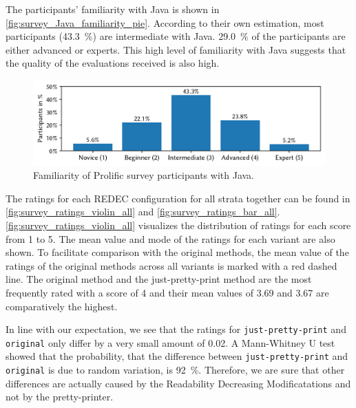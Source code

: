 \documentclass[%
class=scrreprt,
chapterprefix=false,%
open=right,%
twoside=false,%
paper=a4,%
logofile={Logo\_zentral\_farbig\_EN.png},%
thesistype=master,%
UKenglish,%
]{se2thesis}
\theoremstyle{definition}
\newcommand{\rdh}{REDEC\xspace}
\newcommand{\RDMs}{Readability Decreasing Modificatations\xspace}
\newcommand{\none}{just-pretty-print\xspace} %
\newcommand{\nonet}{\texttt{\none}\xspace} %
\begin{document}
	The participants' familiarity with Java is shown in \autoref{fig:survey_Java_familiarity_pie}. According to their own estimation, most participants (43.3~\%) are intermediate with Java. 29.0~\% of the participants are either advanced or experts. This high level of familiarity with Java suggests that the quality of the evaluations received is also high.
	
	\begin{figure}[tb]
		\centering
		\includegraphics[width=\textwidth]{img/survey_java_familiarity_bar.pdf}
		\caption{Familiarity of Prolific survey participants with Java.}
		\label{fig:survey_Java_familiarity_pie}
	\end{figure}
		
	The ratings for each \rdh configuration for all strata together can be found in \autoref{fig:survey_ratings_violin_all} and \autoref{fig:survey_ratings_bar_all}.
	\autoref{fig:survey_ratings_violin_all}  visualizes the distribution of ratings for each score from 1 to 5. The mean value and mode of the ratings for each variant are also shown. To facilitate comparison with the original methods, the mean value of the ratings of the original methods across all variants is marked with a red dashed line. The original method and the just-pretty-print method are the most frequently rated with a score of 4 and their mean values of 3.69 and 3.67 are comparatively the highest.
	
	In line with our expectation, we see that the ratings for \nonet and \texttt{original} only differ by a very small amount of 0.02. A Mann-Whitney U test showed that the probability, that the difference between \nonet and \texttt{original} is due to random variation, is 92~\%.
	Therefore, we are sure that other differences are actually caused by the \RDMs and not by the pretty-printer.
	
\end{document}
